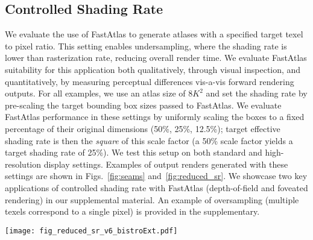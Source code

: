 \subsection{Controlled Shading Rate}
\label{sec:shading_rate}


We evaluate the use of FastAtlas to generate atlases with a specified target texel to pixel ratio. This setting enables  undersampling, where the shading rate is lower than rasterization rate, reducing overall render time. 
We evaluate FastAtlas suitability for this application both qualitatively, through visual inspection, and quantitatively, by measuring perceptual differences vis-a-vis forward rendering outputs.
For all examples, we use an atlas size of $8K^2$ and set the shading rate by pre-scaling the target bounding box sizes passed to FastAtlas. We evaluate FastAtlas performance in these settings by uniformly scaling the boxes to a fixed percentage of their original dimensions (50\%, 25\%, 12.5\%); target effective shading rate is then the {\em square} of this scale factor (a 50\% scale factor yields a target shading rate of 25\%). We test this setup on both standard and high-resolution display settings. Examples of output renders generated with these settings are shown in Figs.~\ref{fig:seams} and~\ref{fig:reduced_sr}. We showcase two key applications of controlled shading rate with FastAtlas (depth-of-field and foveated rendering) in our supplemental material.
An example of oversampling (multiple texels correspond to a single pixel) is provided in the supplementary.

\begin{figure*}
   \texttt{[image: fig\_reduced\_sr\_v6\_bistroExt.pdf]}
    \caption{Comparing FastAtlas to \cite{Neff2022MSA} and a forward upsampling baseline when targeting reduced shading rates. Here, all methods target a shading rate of 12.5\% ($0.125^2=0.016$ or 1.6\% of samples). The forward upsampling baseline (b) introduces jagged artifacts while \cite{Neff2022MSA} (c) exhibits undersampling (highlighted on zoomed images). FastAtlas (d) achieves the most similar results to ground truth forward rendering (a) and preserves important details even at the extremely low 12.5\% shading rate.}
    \label{fig:reduced_sr}
\end{figure*}

